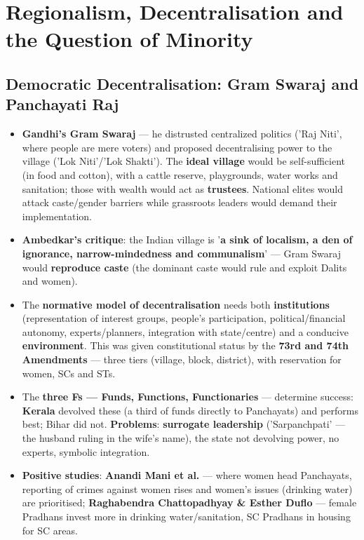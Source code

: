 \chapter{Regionalism, Decentralisation and the Question of Minority}

\section{Democratic Decentralisation: Gram Swaraj and Panchayati Raj}

\begin{KeyConcept}
\begin{itemize}
\item \textbf{Gandhi's Gram Swaraj} --- he distrusted centralized politics ('Raj Niti', where people are mere voters) and proposed decentralising power to the village ('Lok Niti'/'Lok Shakti'). The \textbf{ideal village} would be self-sufficient (in food and cotton), with a cattle reserve, playgrounds, water works and sanitation; those with wealth would act as \textbf{trustees}. National elites would attack caste/gender barriers while grassroots leaders would demand their implementation.
\item \textbf{Ambedkar's critique}: the Indian village is '\textbf{a sink of localism, a den of ignorance, narrow-mindedness and communalism}' --- Gram Swaraj would \textbf{reproduce caste} (the dominant caste would rule and exploit Dalits and women).
\item The \textbf{normative model of decentralisation} needs both \textbf{institutions} (representation of interest groups, people's participation, political/financial autonomy, experts/planners, integration with state/centre) and a conducive \textbf{environment}. This was given constitutional status by the \textbf{73rd and 74th Amendments} --- three tiers (village, block, district), with reservation for women, SCs and STs.
\item The \textbf{three Fs --- Funds, Functions, Functionaries} --- determine success: \textbf{Kerala} devolved these (a third of funds directly to Panchayats) and performs best; Bihar did not. \textbf{Problems}: \textbf{surrogate leadership} ('Sarpanchpati' --- the husband ruling in the wife's name), the state not devolving power, no experts, symbolic integration.
\item \textbf{Positive studies}: \textbf{Anandi Mani et al.} --- where women head Panchayats, reporting of crimes against women rises and women's issues (drinking water) are prioritised; \textbf{Raghabendra Chattopadhyay \& Esther Duflo} --- female Pradhans invest more in drinking water/sanitation, SC Pradhans in housing for SC areas.
\end{itemize}
\end{KeyConcept}

